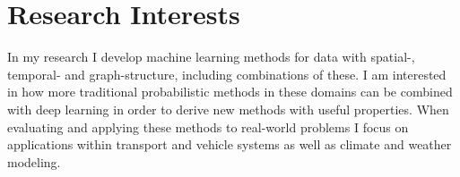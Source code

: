 \section*{Research Interests} %
In my research I develop machine learning methods for data with spatial-, temporal- and graph-structure, including combinations of these.
I am interested in how more traditional probabilistic methods in these domains can be combined with deep learning in order to derive new methods with useful properties.
When evaluating and applying these methods to real-world problems I focus on applications within transport and vehicle systems as well as climate and weather modeling.
